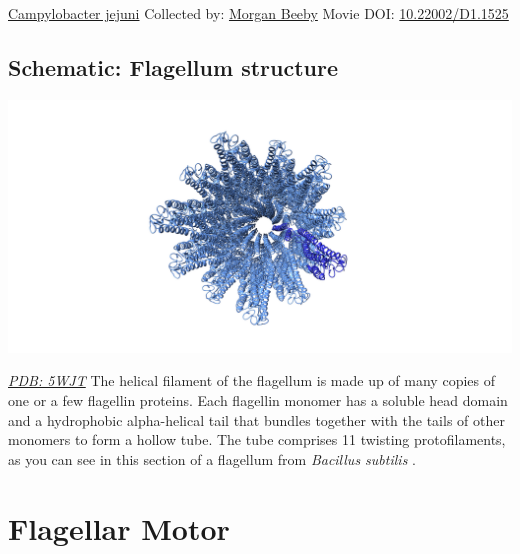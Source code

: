\documentclass[]{tufte-book}
\begin{document}
\hypertarget{htmlwidget-44c62b3184cbbd475e25}{}

\label{fig:6-1}\protect\hyperlink{tree}{Campylobacter jejuni} Collected by: \protect\hyperlink{morgan_beeby}{Morgan Beeby} Movie DOI: \href{https://doi.org/10.22002/D1.1525}{10.22002/D1.1525}

\hypertarget{Flagellum_structure}{%
\subsection*{Schematic: Flagellum structure}\label{Flagellum_structure}}

\includegraphics{img/schematics/6_1_1}

\href{http://rcsb.org/structure/5WJT}{\emph{PDB: 5WJT}}
The helical filament of the flagellum is made up of many copies of one or a few flagellin proteins. Each flagellin monomer has a soluble head domain and a hydrophobic alpha-helical tail that bundles together with the tails of other monomers to form a hollow tube. The tube comprises 11 twisting protofilaments, as you can see in this section of a flagellum from \emph{Bacillus subtilis} \citep{wang2017}.

\hypertarget{flagellar-motor}{%
\section{Flagellar Motor}\label{flagellar-motor}}
\end{document}
